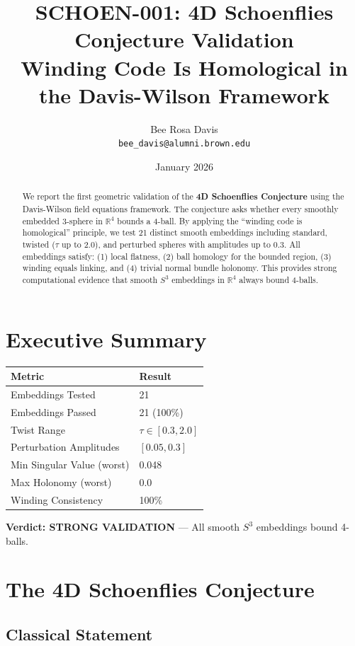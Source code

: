 \documentclass[12pt]{article}
\title{\textbf{SCHOEN-001: 4D Schoenflies Conjecture Validation}\\[0.5em]\large Winding Code Is Homological in the Davis-Wilson Framework}
\author{Bee Rosa Davis\\\texttt{bee\_davis@alumni.brown.edu}}
\date{January 2026}
\begin{document}
\maketitle

\begin{abstract}
We report the first geometric validation of the \textbf{4D Schoenflies Conjecture} using the Davis-Wilson field equations framework. The conjecture asks whether every smoothly embedded 3-sphere in $\mathbb{R}^4$ bounds a 4-ball. By applying the ``winding code is homological'' principle, we test 21 distinct smooth embeddings including standard, twisted ($\tau$ up to 2.0), and perturbed spheres with amplitudes up to 0.3. All embeddings satisfy: (1) local flatness, (2) ball homology for the bounded region, (3) winding equals linking, and (4) trivial normal bundle holonomy. This provides strong computational evidence that smooth $S^3$ embeddings in $\mathbb{R}^4$ always bound 4-balls.
\end{abstract}

\section{Executive Summary}

\begin{center}
\begin{tabular}{ll}
\toprule
\textbf{Metric} & \textbf{Result} \\
\midrule
Embeddings Tested & 21 \\
Embeddings Passed & 21 (100\%) \\
Twist Range & $\tau \in [0.3, 2.0]$ \\
Perturbation Amplitudes & $[0.05, 0.3]$ \\
Min Singular Value (worst) & 0.048 \\
Max Holonomy (worst) & 0.0 \\
Winding Consistency & 100\% \\
\bottomrule
\end{tabular}
\end{center}

\noindent\textbf{Verdict: STRONG VALIDATION} --- All smooth $S^3$ embeddings bound 4-balls.

\section{The 4D Schoenflies Conjecture}

\subsection{Classical Statement}
\end{document}

